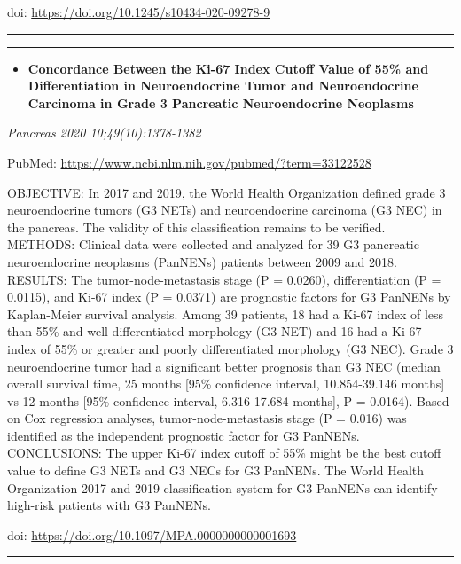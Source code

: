 \documentclass[
]{article}
\providecommand{\tightlist}{%
  \setlength{\itemsep}{0pt}\setlength{\parskip}{0pt}}
\begin{document}
doi: \url{https://doi.org/10.1245/s10434-020-09278-9}

\begin{center}\rule{0.5\linewidth}{0.5pt}\end{center}

\begin{center}\rule{0.5\linewidth}{0.5pt}\end{center}

\begin{itemize}
\tightlist
\item
  \textbf{Concordance Between the Ki-67 Index Cutoff Value of 55\% and
  Differentiation in Neuroendocrine Tumor and Neuroendocrine Carcinoma
  in Grade 3 Pancreatic Neuroendocrine Neoplasms}
\end{itemize}

\emph{Pancreas 2020 10;49(10):1378-1382}

PubMed: \url{https://www.ncbi.nlm.nih.gov/pubmed/?term=33122528}

OBJECTIVE: In 2017 and 2019, the World Health Organization defined grade
3 neuroendocrine tumors (G3 NETs) and neuroendocrine carcinoma (G3 NEC)
in the pancreas. The validity of this classification remains to be
verified. METHODS: Clinical data were collected and analyzed for 39 G3
pancreatic neuroendocrine neoplasms (PanNENs) patients between 2009 and
2018. RESULTS: The tumor-node-metastasis stage (P = 0.0260),
differentiation (P = 0.0115), and Ki-67 index (P = 0.0371) are
prognostic factors for G3 PanNENs by Kaplan-Meier survival analysis.
Among 39 patients, 18 had a Ki-67 index of less than 55\% and
well-differentiated morphology (G3 NET) and 16 had a Ki-67 index of 55\%
or greater and poorly differentiated morphology (G3 NEC). Grade 3
neuroendocrine tumor had a significant better prognosis than G3 NEC
(median overall survival time, 25 months {[}95\% confidence interval,
10.854-39.146 months{]} vs 12 months {[}95\% confidence interval,
6.316-17.684 months{]}, P = 0.0164). Based on Cox regression analyses,
tumor-node-metastasis stage (P = 0.016) was identified as the
independent prognostic factor for G3 PanNENs. CONCLUSIONS: The upper
Ki-67 index cutoff of 55\% might be the best cutoff value to define G3
NETs and G3 NECs for G3 PanNENs. The World Health Organization 2017 and
2019 classification system for G3 PanNENs can identify high-risk
patients with G3 PanNENs.

doi: \url{https://doi.org/10.1097/MPA.0000000000001693}

\begin{center}\rule{0.5\linewidth}{0.5pt}\end{center}
\end{document}
